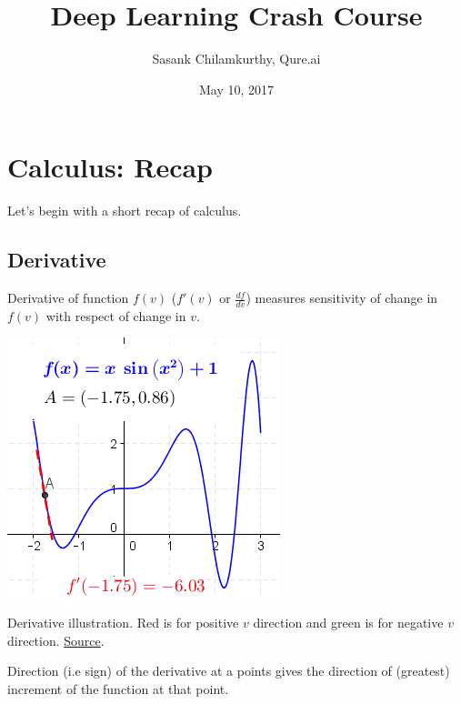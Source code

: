 \documentclass[a4paper]{tufte-handout}
\title{Deep Learning Crash Course}
\author{Sasank Chilamkurthy, Qure.ai}
\date{May 10, 2017}
\begin{document}
\maketitle
\tableofcontents

\section{Calculus: Recap}\label{calculus-recap}

Let's begin with a short recap of calculus.

\subsection{Derivative}\label{derivative}

Derivative of function \(f(v)\) (\(f'(v)\) or \(\frac{df}{dv}\))
measures sensitivity of change in \(f(v)\) with respect of change in
\(v\).

\begin{marginfigure}
  \includegraphics[width=\linewidth]{differential.png}
  \caption{Derivative illustration. Red is for positive \(v\)
direction and green is for negative \(v\) direction.
\href{https://en.wikipedia.org/wiki/Derivative}{Source}.}
\end{marginfigure}

Direction (i.e sign) of the derivative at a points gives the direction
of (greatest) increment of the function at that point.
\end{document}
